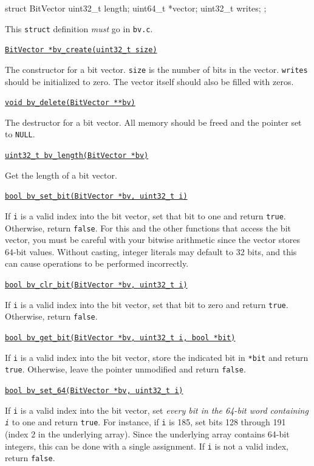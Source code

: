 \documentclass[11pt]{article}
\begin{document}
\begin{clisting}{}
struct BitVector {
    uint32_t length;
    uint64_t *vector;
    uint32_t writes;
};
\end{clisting}

This \texttt{struct} definition \emph{must} go in \texttt{bv.c}.

\setlength{\parindent}{0pt}
\setlength{\parskip}{6pt}

\underline{\texttt{BitVector *bv\_create(uint32\_t size)}}

The constructor for a bit vector. \texttt{size} is the number of bits in the vector. \texttt{writes} should be initialized to zero. The vector itself should also be filled with zeros.
\medskip

\underline{\texttt{void bv\_delete(BitVector **bv)}}

The destructor for a bit vector. All memory should be freed and the pointer set to \texttt{NULL}.
\medskip

\underline{\texttt{uint32\_t bv\_length(BitVector *bv)}}

Get the length of a bit vector.
\medskip

\underline{\texttt{bool bv\_set\_bit(BitVector *bv, uint32\_t i)}}

If \texttt{i} is a valid index into the bit vector, set that bit to one and return \texttt{true}. Otherwise, return \texttt{false}. For this and the other functions that access the bit vector, you must be careful with your bitwise arithmetic since the vector stores 64-bit values. Without casting, integer literals may default to 32 bits, and this can cause operations to be performed incorrectly.
\medskip

\underline{\texttt{bool bv\_clr\_bit(BitVector *bv, uint32\_t i)}}

If \texttt{i} is a valid index into the bit vector, set that bit to zero and return \texttt{true}. Otherwise, return \texttt{false}.
\medskip

\underline{\texttt{bool bv\_get\_bit(BitVector *bv, uint32\_t i, bool *bit)}}

If \texttt{i} is a valid index into the bit vector, store the indicated bit in \texttt{*bit} and return \texttt{true}. Otherwise, leave the pointer unmodified and return \texttt{false}.
\medskip

\underline{\texttt{bool bv\_set\_64(BitVector *bv, uint32\_t i)}}

If \texttt{i} is a valid index into the bit vector, set \emph{every bit in the 64-bit word containing \texttt{i}} to one and return \texttt{true}. For instance, if \texttt{i} is 185, set bits 128 through 191 (index 2 in the underlying array). Since the underlying array contains 64-bit integers, this can be done with a single assignment. If \texttt{i} is not a valid index, return \texttt{false}.
\medskip
\end{document}
